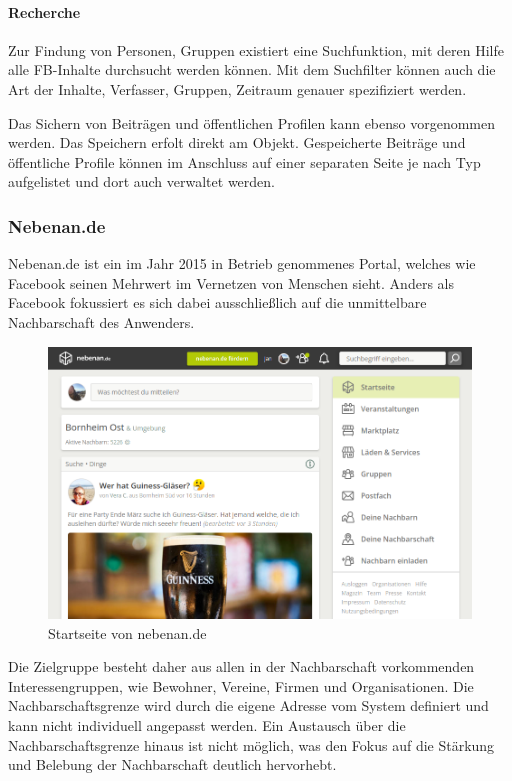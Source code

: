 \paragraph{Recherche}

Zur Findung von Personen, Gruppen \usw existiert eine Suchfunktion, mit deren Hilfe alle FB-Inhalte durchsucht werden können. Mit dem Suchfilter können auch die Art der Inhalte, Verfasser, Gruppen, Zeitraum \uvm genauer spezifiziert werden.

Das Sichern von Beiträgen und öffentlichen Profilen kann ebenso vorgenommen werden. Das Speichern erfolt direkt am Objekt.
Gespeicherte Beiträge und öffentliche Profile können im Anschluss auf einer separaten Seite je nach Typ aufgelistet und dort auch verwaltet werden.

\subsubsection{Nebenan.de}

Nebenan.de ist ein im Jahr 2015 in Betrieb genommenes Portal, welches wie Facebook seinen Mehrwert im Vernetzen von Menschen sieht. Anders als Facebook fokussiert es sich dabei ausschließlich auf die unmittelbare Nachbarschaft des Anwenders.

\begin{figure}
    \centering
    \includegraphics[width=\textwidth]{figures/jan/pic_nebenan.png}
    \caption[Startseite von nebenan.de]{Startseite von nebenan.de}
    \label{fig:nebenan}
\end{figure}

Die Zielgruppe besteht daher aus allen in der Nachbarschaft vorkommenden Interessengruppen, wie \zB Bewohner, Vereine, Firmen und Organisationen. Die Nachbarschaftsgrenze wird durch die eigene Adresse vom System definiert und kann nicht individuell angepasst werden. Ein Austausch über die Nachbarschaftsgrenze hinaus ist nicht möglich, was den Fokus auf die Stärkung und Belebung der Nachbarschaft deutlich hervorhebt.

